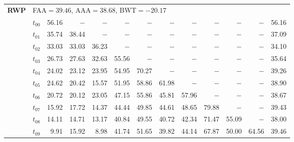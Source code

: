 \begin{table}[ht]
\begin{tabular}{@{}l l r r r r r r r r r r r@{}}
\midrule
\multirow{11}{*}{\textbf{RWP}} & \multicolumn{12}{l}{\quad\small FAA$=39.46$,\; AAA$=38.68$,\; BWT$=-20.17$} \\
 & $t_{00}$ & 56.16 & $-$ & $-$ & $-$ & $-$ & $-$ & $-$ & $-$ & $-$ & $-$ & 56.16 \\
 & $t_{01}$ & 35.74 & 38.44 & $-$ & $-$ & $-$ & $-$ & $-$ & $-$ & $-$ & $-$ & 37.09 \\
 & $t_{02}$ & 33.03 & 33.03 & 36.23 & $-$ & $-$ & $-$ & $-$ & $-$ & $-$ & $-$ & 34.10 \\
 & $t_{03}$ & 26.73 & 27.63 & 32.63 & 55.56 & $-$ & $-$ & $-$ & $-$ & $-$ & $-$ & 35.64 \\
 & $t_{04}$ & 24.02 & 23.12 & 23.95 & 54.95 & 70.27 & $-$ & $-$ & $-$ & $-$ & $-$ & 39.26 \\
 & $t_{05}$ & 24.62 & 20.42 & 15.57 & 51.95 & 58.86 & 61.98 & $-$ & $-$ & $-$ & $-$ & 38.90 \\
 & $t_{06}$ & 20.72 & 20.12 & 23.05 & 47.15 & 55.86 & 45.81 & 57.96 & $-$ & $-$ & $-$ & 38.67 \\
 & $t_{07}$ & 15.92 & 17.72 & 14.37 & 44.44 & 49.85 & 44.61 & 48.65 & 79.88 & $-$ & $-$ & 39.43 \\
 & $t_{08}$ & 14.11 & 14.71 & 13.17 & 40.84 & 49.55 & 40.72 & 42.34 & 71.47 & 55.09 & $-$ & 38.00 \\
 & $t_{09}$ & 9.91 & 15.92 & 8.98 & 41.74 & 51.65 & 39.82 & 44.14 & 67.87 & 50.00 & 64.56 & 39.46 \\
\bottomrule
\end{tabular}
\end{table}

